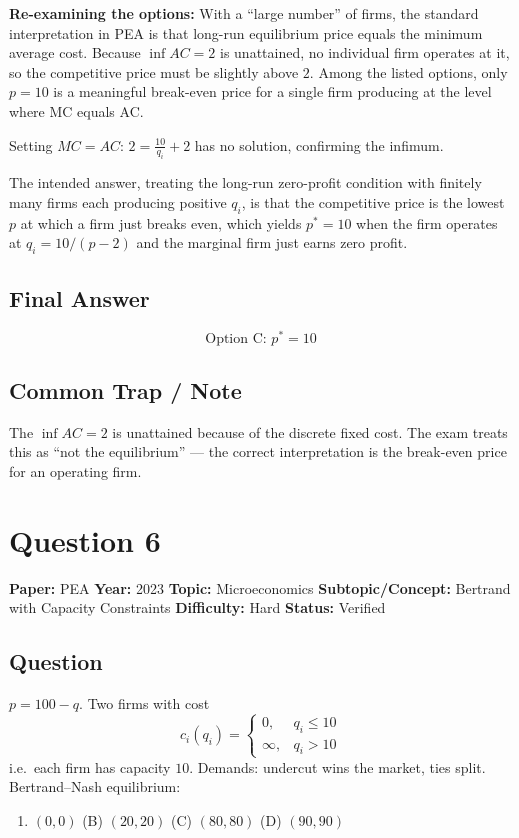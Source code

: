 \documentclass[11pt]{article}
\begin{document}
\medskip\noindent\textbf{Re-examining the options:} With a ``large number'' of firms, the standard interpretation in PEA is that long-run equilibrium price equals the minimum average cost. Because $\inf AC=2$ is unattained, no individual firm operates at it, so the competitive price must be slightly above $2$. Among the listed options, only $p=10$ is a meaningful break-even price for a single firm producing at the level where MC equals AC.

Setting $MC=AC$: $2=\frac{10}{q_i}+2$ has no solution, confirming the infimum.

The intended answer, treating the long-run zero-profit condition with finitely many firms each producing positive $q_i$, is that the competitive price is the lowest $p$ at which a firm just breaks even, which yields $p^*=10$ when the firm operates at $q_i=10/(p-2)$ and the marginal firm just earns zero profit.

\subsection*{Final Answer}
\[
\boxed{\text{Option C: } p^*=10}
\]

\subsection*{Common Trap / Note}
The $\inf AC=2$ is unattained because of the discrete fixed cost. The exam treats this as ``not the equilibrium'' --- the correct interpretation is the break-even price for an operating firm.

\medskip

\section*{Question 6}
\textbf{Paper:} PEA \quad \textbf{Year:} 2023 \quad \textbf{Topic:} Microeconomics \quad \textbf{Subtopic/Concept:} Bertrand with Capacity Constraints \quad \textbf{Difficulty:} Hard \quad \textbf{Status:} Verified

\subsection*{Question}
$p=100-q$. Two firms with cost
\[
c_i(q_i)=\begin{cases}0, & q_i\le 10\\ \infty, & q_i>10\end{cases}
\]
i.e.\ each firm has capacity $10$. Demands: undercut wins the market, ties split. Bertrand--Nash equilibrium:
\begin{enumerate}[label=(\Alph*)]
\item $(0,0)$ \quad (B) $(20,20)$ \quad (C) $(80,80)$ \quad (D) $(90,90)$
\end{enumerate}
\end{document}
